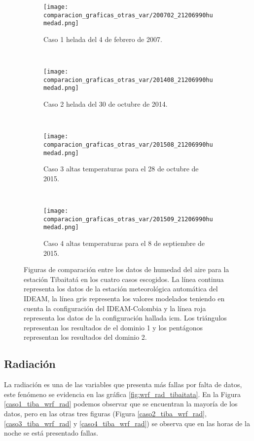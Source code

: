 \begin{figure}[H]

\begin{subfigure}[normla]{0.4\textwidth}
\caption{Caso 1 helada del 4 de febrero de 2007.}
\label{caso1_tiba_wrf_hum}
\texttt{[image: comparacion\_graficas\_otras\_var/200702\_21206990humedad.png]}
\end{subfigure}
~
\begin{subfigure}[normla]{0.4\textwidth}
\caption{Caso 2 helada del 30 de octubre de 2014.}
\label{caso2_tiba_wrf_hum}
\texttt{[image: comparacion\_graficas\_otras\_var/201408\_21206990humedad.png]}
\end{subfigure}
~
\centering
\begin{subfigure}[normla]{0.4\textwidth}
\caption{Caso 3 altas temperaturas para el 28 de octubre de 2015.}
\label{caso3_tiba_wrf_hum}
\texttt{[image: comparacion\_graficas\_otras\_var/201508\_21206990humedad.png]}
\end{subfigure}
~
\centering
\begin{subfigure}[normla]{0.4\textwidth}
\caption{Caso 4 altas temperaturas para el 8 de septiembre de 2015.}
\label{caso4_tiba_wrf_hum}
\texttt{[image: comparacion\_graficas\_otras\_var/201509\_21206990humedad.png]}
\end{subfigure}

    \caption{Figuras de comparación entre los datos de humedad del aire para la estación Tibaitatá en los cuatro casos escogidos. La línea continua representa los datos de la estación meteorológica automática del IDEAM, la línea gris representa los valores modelados teniendo en cuenta la configuración del IDEAM-Colombia y la línea roja representa los datos de la configuración hallada icm. Los triángulos representan los resultados de el dominio 1 y los pentágonos representan los resultados del dominio 2.}
    \label{fig:wrf_hum_tibaitata}
\end{figure}


\subsection{Radiación}


La radiación es una de las variables que presenta más fallas por falta de datos, este fenómeno se evidencia en las gráfica \ref{fig:wrf_rad_tibaitata}. En la Figura \ref{caso1_tiba_wrf_rad} podemos observar que se encuentran la mayoría de los datos, pero en las otras tres figuras (Figura \ref{caso2_tiba_wrf_rad}, \ref{caso3_tiba_wrf_rad} y \ref{caso4_tiba_wrf_rad}) se observa que en las horas de la noche se está presentado fallas.\\

